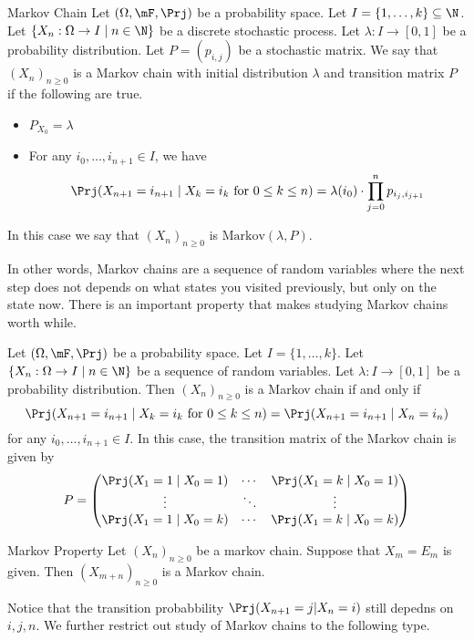 \documentclass[a4paper]{article}
\begin{document}
\begin{defn}{Markov Chain}{} Let $(\Omega,\mF,\Prj)$ be a probability space. Let $I=\{1,\dots,k\}\subseteq\N$. Let $\{X_n:\Omega\to I\;|\;n\in\N\}$ be a discrete stochastic process. Let $\lambda:I\to[0,1]$ be a probability distribution. Let $P=(p_{i,j})$ be a stochastic matrix. We say that $(X_n)_{n\geq 0}$ is a Markov chain with initial distribution $\lambda$ and transition matrix $P$ if the following are true. 
\begin{itemize}
\item $P_{X_0}=\lambda$
\item For any $i_0,\dots,i_{n+1}\in I$, we have $$\Prj(X_{n+1}=i_{n+1}\;|\;X_k=i_k\text{ for }0\leq k\leq n)=\lambda(i_0)\cdot\prod_{j=0}^n p_{i_j,i_{j+1}}$$ 
\end{itemize}
In this case we say that $(X_n)_{n\geq 0}$ is $\text{Markov}(\lambda,P)$. 
\end{defn}

In other words, Markov chains are a sequence of random variables where the next step does not depends on what states you visited previously, but only on the state now. There is an important property that makes studying Markov chains worth while. 

\begin{prp}{}{} Let $(\Omega,\mF,\Prj)$ be a probability space. Let $I=\{1,\dots,k\}$. Let $\{X_n:\Omega\to I\;|\;n\in\N\}$ be a sequence of random variables. Let $\lambda:I\to[0,1]$ be a probability distribution. Then $(X_n)_{n\geq 0}$ is a Markov chain if and only if $$\Prj(X_{n+1}=i_{n+1}\;|\;X_k=i_k\text{ for }0\leq k\leq n)=\Prj(X_{n+1}=i_{n+1}\;|\;X_n=i_n)$$ for any $i_0,\dots,i_{n+1}\in I$. In this case, the transition matrix of the Markov chain is given by $$P=\begin{pmatrix}
\Prj(X_1=1\;|\;X_0=1) & \cdots & \Prj(X_1=k\;|\;X_0=1)\\
\vdots & \ddots & \vdots\\
\Prj(X_1=1\;|\;X_0=k) & \cdots & \Prj(X_1=k\;|\;X_0=k)
\end{pmatrix}$$
\end{prp}

\begin{thm}{Markov Property}{} Let $(X_n)_{n\geq0}$ be a markov chain. Suppose that $X_m=E_m$ is given. Then $(X_{m+n})_{n\geq 0}$ is a Markov chain. 
\end{thm}


Notice that the transition probabbility $\Prj(X_{n+1}=j|X_n=i)$ still depedns on $i,j,n$. We further restrict out study of Markov chains to the following type. 
\end{document}
